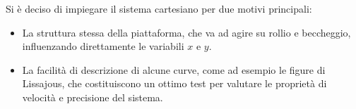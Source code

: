 \documentclass[12pt,twoside,openright]{report}
\begin{document}
Si è deciso di impiegare il sistema cartesiano per due motivi principali: 
\begin{itemize}
\item La struttura stessa della piattaforma, che va ad agire su rollio e beccheggio, influenzando direttamente le variabili $x$ e $y$.
\item La facilità di descrizione di alcune curve, come ad esempio le figure di Lissajous, che costituiscono un ottimo test per valutare le proprietà di velocità e precisione del sistema.
\end{itemize}


\end{document}
